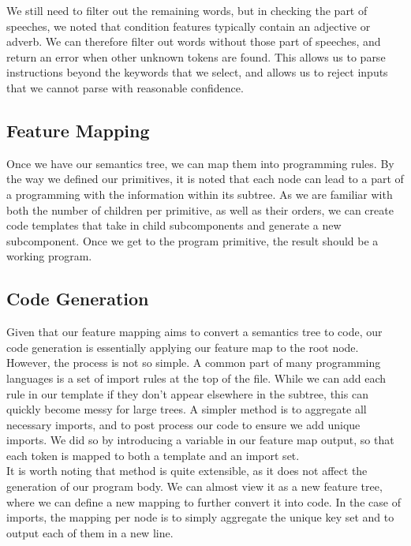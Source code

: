 \documentclass[11pt,letterpaper]{article}
\begin{document}
We still need to filter out the remaining words, but in checking the part of speeches, we noted that condition features typically contain an adjective or adverb.
We can therefore filter out words without those part of speeches, and return an error when other unknown tokens are found.
This allows us to parse instructions beyond the keywords that we select, and allows us to reject inputs that we cannot parse with reasonable confidence.

\subsection{Feature Mapping}

Once we have our semantics tree, we can map them into programming rules.
By the way we defined our primitives, it is noted that each node can lead to a part of a programming with the information within its subtree.
As we are familiar with both the number of children per primitive, as well as their orders, we can create code templates that take in child subcomponents and generate a new subcomponent.
Once we get to the program primitive, the result should be a working program.

\subsection{Code Generation}

Given that our feature mapping aims to convert a semantics tree to code, our code generation is essentially applying our feature map to the root node.
However, the process is not so simple.
A common part of many programming languages is a set of import rules at the top of the file.
While we can add each rule in our template if they don't appear elsewhere in the subtree, this can quickly become messy for large trees.
A simpler method is to aggregate all necessary imports, and to post process our code to ensure we add unique imports.
We did so by introducing a variable in our feature map output, so that each token is mapped to both a template and an import set.\\

It is worth noting that method is quite extensible, as it does not affect the generation of our program body.
We can almost view it as a new feature tree, where we can define a new mapping to further convert it into code.
In the case of imports, the mapping per node is to simply aggregate the unique key set and to output each of them in a new line.
\end{document}
